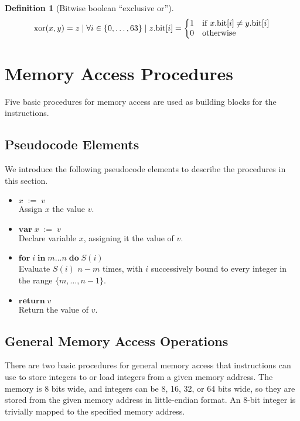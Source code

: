 \documentclass[a4paper,10pt]{article}
\newcommand{\bitno}[2]{#1.\mathrm{bit}[#2]}
\newcommand{\range}[2]{\{#1,\ldots,#2\}}
\newcommand{\set}[2]{#1\;:=\;#2}
\newcommand{\Var}[2]{\mathbf{var}\;#1\;:=\;#2\;}
\newcommand{\dotimes}[4]{\mathbf{for}\;#1\;\mathbf{in}\;#2\ldots#3\;\mathbf{do}\;#4}
\newcommand{\return}[1]{\mathbf{return} \; #1}
\DeclareMathOperator{\BitXor}{xor}
\theoremstyle{definition}
\newtheorem{definition}{Definition}
\begin{document}
\begin{definition}[Bitwise boolean ``exclusive or'']
  \[ \BitXor(x, y) = z \mid  
    \forall i \in \range{0}{63} \mid \bitno{z}{i} = \left\{
      \begin{array}{@{}ll@{}}
        1 & \mathrm{if} \; \bitno{x}{i} \neq \bitno{y}{i} \\
        0 & \mathrm{otherwise}
      \end{array}
    \right. \]
\end{definition}

\section{Memory Access Procedures}

Five basic procedures for memory access are used as building blocks for the instructions.

\subsection{Pseudocode Elements}

We introduce the following pseudocode elements to describe the procedures in this section.
\begin{itemize}
\item $\set{x}{v}$\\Assign $x$ the value $v$.
\item $\Var{x}{v}$\\Declare variable $x$, assigning it the value of $v$.
\item $\dotimes{i}{m}{n}{S(i)}$\\Evaluate $S(i)$ $n-m$ times, with $i$ successively bound to every integer in the range $\range{m}{n-1}$.
\item $\return{v}$\\Return the value of $v$.
\end{itemize}

\subsection{General Memory Access Operations}

There are two basic procedures for general memory access that instructions can use to store integers to or load integers from a given memory address.
The memory is 8 bits wide, and integers can be 8, 16, 32, or 64 bits wide, so they are stored from the given memory address in little-endian format. 
An 8-bit integer is trivially mapped to the specified memory address.
\end{document}
